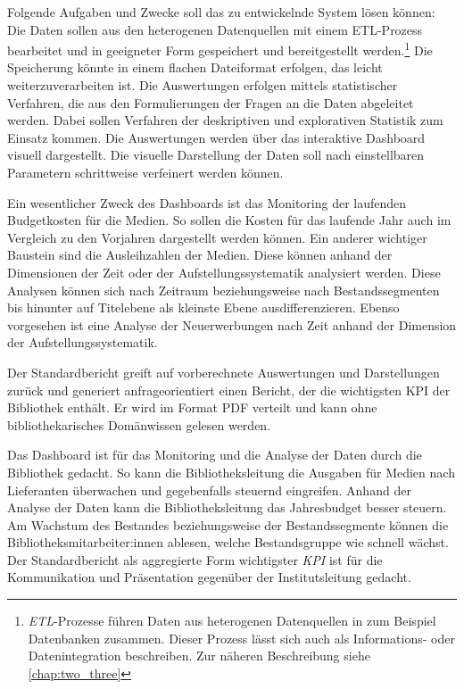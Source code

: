 Folgende Aufgaben und Zwecke soll das zu entwickelnde System lösen können:
Die Daten sollen aus den heterogenen Datenquellen mit einem \acrfull{ETL}-Prozess bearbeitet und in
geeigneter Form gespeichert und bereitgestellt werden.\footnote{ \textit{\acrshort{ETL}}-Prozesse führen Daten aus heterogenen Datenquellen
in zum Beispiel Datenbanken zusammen. Dieser Prozess lässt sich auch als Informations- oder Datenintegration beschreiben. Zur näheren Beschreibung siehe \autoref{chap:two_three}}  Die Speicherung könnte in einem flachen Dateiformat erfolgen, das leicht
weiterzuverarbeiten ist. Die Auswertungen erfolgen mittels statistischer Verfahren, 
die aus den Formulierungen der Fragen an die Daten abgeleitet werden. Dabei sollen Verfahren der deskriptiven und explorativen Statistik zum Einsatz kommen.
Die Auswertungen werden über das interaktive Dashboard visuell dargestellt.
Die visuelle Darstellung der Daten soll nach einstellbaren Parametern schrittweise verfeinert werden können.

Ein wesentlicher Zweck des Dashboards ist das Monitoring der laufenden Budgetkosten für die Medien. So sollen die Kosten für das laufende Jahr auch im Vergleich zu den
Vorjahren dargestellt werden können. Ein anderer wichtiger Baustein sind die Ausleihzahlen der Medien. Diese können
anhand der Dimensionen der Zeit oder der Aufstellungssystematik analysiert werden. Diese Analysen können sich 
nach Zeitraum beziehungsweise nach Bestandssegmenten bis hinunter auf Titelebene als kleinste Ebene ausdifferenzieren. 
Ebenso vorgesehen ist eine Analyse der Neuerwerbungen nach Zeit anhand der Dimension der Aufstellungssystematik.

Der Standardbericht greift auf vorberechnete Auswertungen und Darstellungen zurück und generiert anfrageorientiert einen Bericht, der die wichtigsten 
\acrfull{KPI} der Bibliothek enthält. Er wird im Format PDF verteilt und kann ohne bibliothekarisches Domänwissen gelesen werden.

Das Dashboard ist für das Monitoring und die Analyse der Daten durch die Bibliothek gedacht. 
So kann die Bibliotheksleitung die Ausgaben für Medien nach Lieferanten überwachen und gegebenfalls steuernd eingreifen.
Anhand der Analyse der Daten kann die Bibliotheksleitung das Jahresbudget besser steuern.
Am Wachstum des Bestandes beziehungsweise der Bestandssegmente können die Bibliotheksmitarbeiter:innen ablesen, welche Bestandsgruppe
wie schnell wächst.
Der Standardbericht als aggregierte Form wichtigster \textit{\acrshort{KPI}} ist für die Kommunikation und Präsentation gegenüber der Institutsleitung gedacht.

